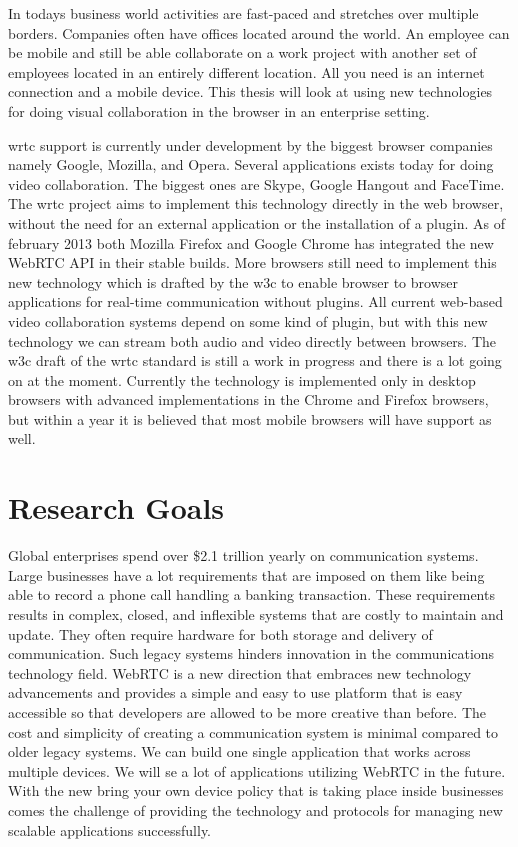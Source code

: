 
In todays business world activities are fast-paced and stretches over multiple borders. Companies often have offices located around the world. An employee can be mobile and still be able collaborate on a work project with another set of employees located in an entirely different location. All you need is an internet connection and a mobile device. This thesis will look at using new technologies for doing visual collaboration in the browser in an enterprise setting.

\gls{wrtc} support is currently under development by the biggest browser companies namely Google, Mozilla, and Opera. Several applications exists today for doing video collaboration. The biggest ones are Skype, Google Hangout and FaceTime. The \gls{wrtc} project aims to implement this technology directly in the web browser, without the need for an external application or the installation of a plugin. As of february 2013 both Mozilla Firefox and Google Chrome has integrated the new WebRTC API in their stable builds. More browsers still need to implement this new technology which is drafted by the \gls{w3c} to enable browser to browser applications for real-time communication without plugins. All current web-based video collaboration systems depend on some kind of plugin, but with this new technology we can stream both audio and video directly between browsers. The \gls{w3c} draft of the \gls{wrtc} standard is still a work in progress and there is a lot going on at the moment. Currently the technology is implemented only in desktop browsers with advanced implementations in the Chrome and Firefox browsers, but within a year it is believed that most mobile browsers will have support as well.

\section{Research Goals}
Global enterprises spend over \$2.1 trillion yearly on communication systems. Large businesses have a lot requirements that are imposed on them like being able to record a phone call handling a banking transaction. These requirements results in complex, closed, and inflexible systems that are costly to maintain and update. They often require hardware for both storage and delivery of communication. Such legacy systems hinders innovation in the communications technology field. WebRTC is a new direction that embraces new technology advancements and provides a simple and easy to use platform that is easy accessible so that developers are allowed to be more creative than before. The cost and simplicity of creating a communication system is minimal compared to older legacy systems. We can build one single application that works across multiple devices. We will se a lot of applications utilizing WebRTC in the future. With the new bring your own device policy that is taking place inside businesses comes the challenge of providing the technology and protocols for managing new scalable applications successfully.

